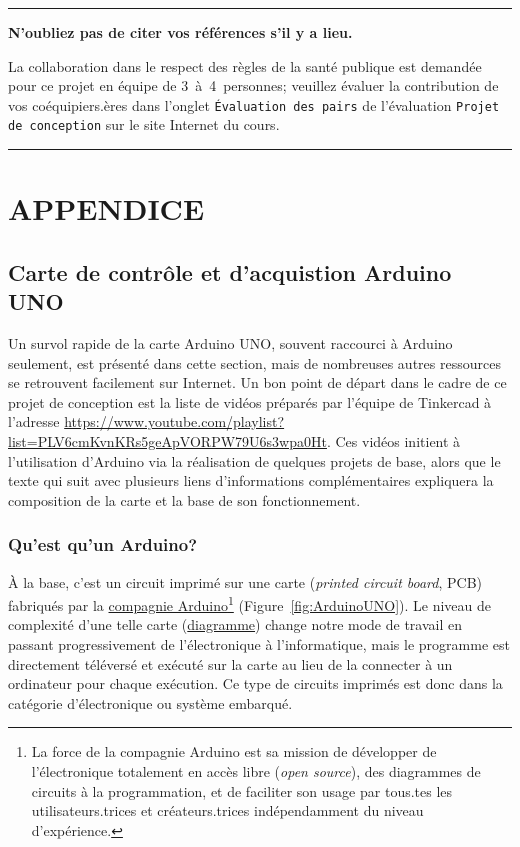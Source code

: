 \documentclass[english,french,12pt]{article}
\begin{document}
\vfill
\hrule
\vspace{0.3em}
\centering
\textbf{N'oubliez pas de citer vos références s'il y a lieu.}\par
\vspace{-0.3em}
La collaboration dans le respect des règles de la santé publique est demandée pour ce projet en équipe de 3~à~4~personnes; veuillez évaluer la contribution de vos coéquipiers.ères dans l'onglet \texttt{Évaluation des pairs} de l'évaluation \texttt{Projet de conception} sur le site Internet du cours.\par
\vspace{1em}
\hrule

\newpage
%
\justify
\section*{APPENDICE}
\label{sec:annexe}

\subsection*{Carte de contrôle et d'acquistion Arduino UNO}
Un survol rapide de la carte Arduino UNO, souvent raccourci à Arduino seulement, est présenté dans cette section, mais de nombreuses autres ressources se retrouvent facilement sur Internet. Un bon point de départ dans le cadre de ce projet de conception est la liste de vidéos préparés par l'équipe de Tinkercad à l'adresse \url{https://www.youtube.com/playlist?list=PLV6cmKvnKRs5geApVORPW79U6s3wpa0Ht}. Ces vidéos initient à l'utilisation d'Arduino via la réalisation de quelques projets de base, alors que le texte qui suit avec plusieurs liens d'informations complémentaires expliquera la composition de la carte et la base de son fonctionnement. 

\subsubsection*{Qu'est qu'un Arduino?}
À la base, c'est un circuit imprimé sur une carte (\textit{printed circuit board}, PCB) fabriqués par la \href{https://www.arduino.cc/}{ compagnie Arduino}\footnote{La force de la compagnie Arduino est sa mission de développer de l'électronique totalement en accès libre (\textit{open source}), des diagrammes de circuits à la programmation, et de faciliter son usage par tous.tes les utilisateurs.trices et créateurs.trices indépendamment du niveau d'expérience.} (Figure~\ref{fig:ArduinoUNO}). Le niveau de complexité d'une telle carte (\href{https://content.arduino.cc/assets/UNO-TH_Rev3e_sch.pdf}{diagramme}) change notre mode de travail en passant progressivement de l'électronique à l'informatique, mais le programme est directement téléversé et exécuté sur la carte au lieu de la connecter à un ordinateur pour chaque exécution. Ce type de circuits imprimés est donc dans la catégorie d'électronique ou système embarqué.
\end{document}
